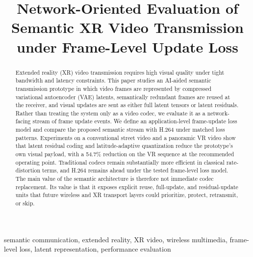 \documentclass[conference]{IEEEtran}
\begin{document}
\title{Network-Oriented Evaluation of Semantic XR Video Transmission under Frame-Level Update Loss}

\author{
}

\maketitle

\begin{abstract}
Extended reality (XR) video transmission requires high visual quality under tight bandwidth and latency constraints. This paper studies an AI-aided semantic transmission prototype in which video frames are represented by compressed variational autoencoder (VAE) latents, semantically redundant frames are reused at the receiver, and visual updates are sent as either full latent tensors or latent residuals. Rather than treating the system only as a video codec, we evaluate it as a network-facing stream of frame update events. We define an application-level frame-update loss model and compare the proposed semantic stream with H.264 under matched loss patterns. Experiments on a conventional street video and a panoramic VR video show that latent residual coding and latitude-adaptive quantization reduce the prototype's own visual payload, with a 54.7\% reduction on the VR sequence at the recommended operating point. Traditional codecs remain substantially more efficient in classical rate-distortion terms, and H.264 remains ahead under the tested frame-level loss model. The main value of the semantic architecture is therefore not immediate codec replacement. Its value is that it exposes explicit reuse, full-update, and residual-update units that future wireless and XR transport layers could prioritize, protect, retransmit, or skip.
\end{abstract}

\begin{IEEEkeywords}
semantic communication, extended reality, XR video, wireless multimedia, frame-level loss, latent representation, performance evaluation
\end{IEEEkeywords}

\end{document}
